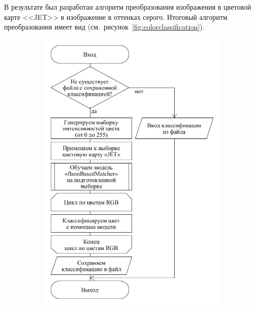 \documentclass[14pt, a4paper]{extreport}
\begin{document}
	В результате был разработан алгоритм преобразования изображения в цветовой карте <<JET>> в изображение в оттенках серого. Итоговый алгоритм преобразования имеет вид (см.~рисунок~\ref{fig:colorclassification}).
	
	\begin{figure}[h!]
		\begin{subfigure}{.6\textwidth}
			\centering
			\includegraphics[width = \textwidth]{image/chapter_2/colorclassification}
			\caption{}
		\end{subfigure}
		\begin{subfigure}{.31\textwidth}
			\centering

\end{subfigure}
\end{figure}
\end{document}
